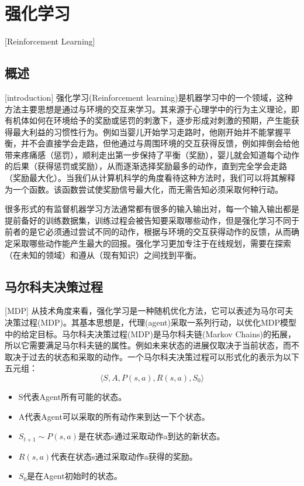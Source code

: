 \section{强化学习}[Reinforcement Learning]
\subsection{概述}[introduction]
强化学习(Reinforcement learning)\cite{RLIntroduction}是机器学习中的一个领域，这种方法主要思想是通过与环境的交互来学习。其来源于心理学中的行为主义理论，即有机体如何在环境给予的奖励或惩罚的刺激下，逐步形成对刺激的预期，产生能获得最大利益的习惯性行为。例如当婴儿开始学习走路时，他刚开始并不能掌握平衡，并不会直接学会走路，但他通过与周围环境的交互获得反馈，例如摔倒会给他带来疼痛感（惩罚），顺利走出第一步保持了平衡（奖励），婴儿就会知道每个动作的后果（获得惩罚或奖励），从而逐渐选择奖励最多的动作，直到完全学会走路（奖励最大化）。当我们从计算机科学的角度看待这种方法时，我们可以将其解释为一个函数。该函数尝试使奖励信号最大化，而无需告知必须采取何种行动。

很多形式的有监督机器学习方法通常都有很多的输入输出对，每一个输入输出都是提前备好的训练数据集，训练过程会被告知要采取哪些动作，但是强化学习不同于前者的是它必须通过尝试不同的动作，根据与环境的交互获得动作的反馈，从而确定采取哪些动作能产生最大的回报。强化学习更加专注于在线规划，需要在探索（在未知的领域）和遵从（现有知识）之间找到平衡。

\subsection{马尔科夫决策过程}[MDP]
从技术角度来看，强化学习是一种随机优化方法，它可以表述为马尔可夫决策过程(MDP)\cite{MDP}。其基本思想是，代理(agent)采取一系列行动，以优化MDP模型中的给定目标。马尔科夫决策过程(MDP)是马尔科夫链(Markov Chains)的拓展，所以它需要满足马尔科夫链的属性。例如未来状态的进展仅取决于当前状态，而不取决于过去的状态和采取的动作。一个马尔科夫决策过程可以形式化的表示为以下五元组：
\begin{equation}\label{MDP5}
\langle S, A, P(s,a),R(s,a),S_0 \rangle
\end{equation}
\begin{itemize}
    \item S代表Agent所有可能的状态。
    \item A代表Agent可以采取的所有动作来到达一下个状态。
    \item $S_{t+1}\sim P(s,a)$是在状态s通过采取动作a到达的新状态。
    \item $R(s,a)$代表在状态s通过采取动作a获得的奖励。
    \item $S_0$是在Agent初始时的状态。
\end{itemize}

